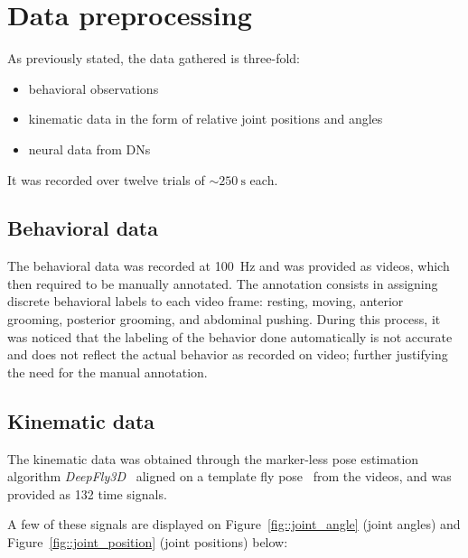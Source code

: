 \section{Data preprocessing}

As previously stated, the data gathered is three-fold:

\begin{itemize}
	\item behavioral observations
	\item kinematic data in the form of relative joint positions and angles
	\item neural data from DNs
\end{itemize}

It was recorded over twelve trials of $\sim\SI{250}{\second}$ each.

\subsection{Behavioral data}

The behavioral data was recorded at \SI{100}{\hertz} and was provided as videos, which then required to be manually annotated.
The annotation consists in assigning discrete behavioral labels to each video frame: resting, moving, anterior grooming, posterior grooming, and abdominal pushing.
During this process, it was noticed that the labeling of the behavior done automatically is not accurate and does not reflect the actual behavior as recorded on video; further justifying the need for the manual annotation.

\subsection{Kinematic data}

The kinematic data was obtained through the marker-less pose estimation algorithm \textit{DeepFly3D}~\cite{gunel2019} aligned on a template fly pose~\cite{lobatos2021} from the videos, and was provided as 132 time signals.

\vspace{\baselineskip}

A few of these signals are displayed on Figure~\ref{fig::joint_angle} (joint angles) and Figure~\ref{fig::joint_position} (joint positions) below:

